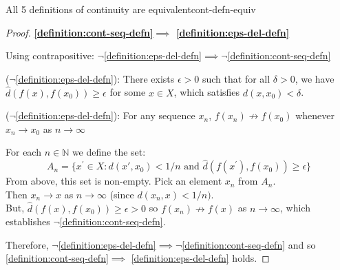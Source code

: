 \documentclass{article}
\numberwithin{equation}{section}
\numberwithin{figure}{section}
\begin{document}
\begin{theorem}{All 5 definitions of continuity are equivalent}{cont-defn-equiv}
\begin{proof}
        \textbf{\cref{definition:cont-seq-defn}$\implies$ \cref{definition:eps-del-defn}} 

        Using contrapositive: $\neg$\cref{definition:eps-del-defn}$\implies\neg$\cref{definition:cont-seq-defn}

        ($\neg$\cref{definition:eps-del-defn}): There exists $\epsilon>0$ such that for all $\delta>0$, we have $\hat{d}(f(x),f(x_0))\geq\epsilon$ for some $x \in X$, which satisfies  $d(x,x_0)<\delta$.

        ($\neg$\cref{definition:eps-del-defn}): For any sequence $x_n$, $f(x_n) \not\to f(x_0)$ whenever $x_n \to x_0$ as $n \to\infty$

        For each $n \in \mathbb{N}$ we define the set:
        \begin{equation}
            A_n = \{ x^\prime \in X : d(x', x_0) < 1/n \text{ and } \hat{d}(f(x^\prime),f(x_0))\geq\epsilon\}
        \end{equation}
        From above, this set is non-empty. Pick an element $x_n$ from $A_n$.\\
        Then $x_n \to x$ as $n \to \infty$ (since $d(x_n,x)<1/n)$.\\
        But, $\hat{d}(f(x),f(x_0))\geq\epsilon>0$ so $f(x_n) \not\to f(x)$ as $n \to \infty$, which establishes $\neg$\cref{definition:cont-seq-defn}.

        Therefore, $\neg$\cref{definition:eps-del-defn}$\implies\neg$\cref{definition:cont-seq-defn}  and so \cref{definition:cont-seq-defn}$\implies$ \cref{definition:eps-del-defn} holds.
    \end{proof}
\end{theorem}
\end{document}
